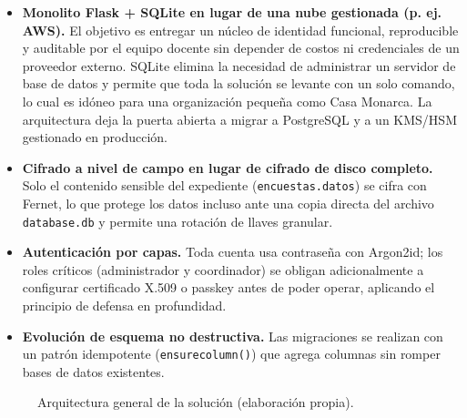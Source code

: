 \documentclass[10pt,letterpaper]{report}
\renewcommand{\_}{\textunderscore\allowbreak}
\begin{document}
\begin{itemize}[leftmargin=1.4em]
  \item \textbf{Monolito Flask + SQLite en lugar de una nube gestionada
  (p. ej. AWS).} El objetivo es entregar un n\'ucleo de identidad
  funcional, reproducible y auditable por el equipo docente sin depender de
  costos ni credenciales de un proveedor externo. SQLite elimina la necesidad de
  administrar un servidor de base de datos y permite que toda la soluci\'on se
  levante con un solo comando, lo cual es id\'oneo para una organizaci\'on peque\~na
  como Casa Monarca. La arquitectura deja la puerta abierta a migrar a
  PostgreSQL y a un KMS/HSM gestionado en producci\'on.
  \item \textbf{Cifrado a nivel de campo en lugar de cifrado de disco
  completo.} Solo el contenido sensible del expediente (\texttt{encuestas.datos})
  se cifra con Fernet, lo que protege los datos incluso ante una copia directa
  del archivo \texttt{database.db} y permite una rotaci\'on de llaves granular.
  \item \textbf{Autenticaci\'on por capas.} Toda cuenta usa contrase\~na con
  Argon2id; los roles cr\'iticos (administrador y coordinador) se obligan
  adicionalmente a configurar certificado X.509 o passkey antes de poder operar,
  aplicando el principio de defensa en profundidad.
  \item \textbf{Evoluci\'on de esquema no destructiva.} Las migraciones se
  realizan con un patr\'on idempotente (\texttt{ensure\_column()}) que agrega
  columnas sin romper bases de datos existentes.
\end{itemize}

\begin{figure}[ht]
\centering
{}
\caption{Arquitectura general de la soluci\'on (elaboraci\'on propia).}
\label{fig:arq}
\end{figure}
\end{document}
